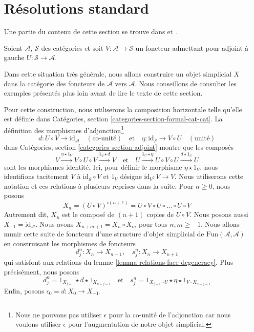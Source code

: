 \section{Résolutions standard}
\label{section-standard}

\noindent
Une partie du contenu de cette section se trouve dans
\cite[Appendice 1]{Godement} et \cite[I 1.5]{cotangent}.

\begin{situation}
\label{situation-adjoint-functors}
Soient $\mathcal{A}$, $\mathcal{S}$ des catégories et soit
$V : \mathcal{A} \to \mathcal{S}$ un foncteur admettant pour adjoint à gauche
$U : \mathcal{S} \to \mathcal{A}$.
\end{situation}

\noindent
Dans cette situation très générale, nous allons construire un objet
simplicial $X$ dans la catégorie des foncteurs de $\mathcal{A}$ vers $\mathcal{A}$.
Nous conseillons de consulter les exemples présentés plus loin avant de lire
le texte de cette section.

\medskip\noindent
Pour cette construction, nous utiliserons la composition horizontale telle
qu'elle est définie dans Catégories, section \ref{categories-section-formal-cat-cat}.
La définition des morphismes d'adjonction\footnote{Nous ne pouvons pas utiliser
$\epsilon$ pour la co-unité de l'adjonction
car nous voulons utiliser $\epsilon$ pour
l'augmentation de notre objet simplicial.}
$$
d : U \circ V \to \text{id}_\mathcal{A} \quad (\text{co-unité})
\quad\text{et}\quad
\eta : \text{id}_\mathcal{S} \to V \circ U \quad (\text{unité})
$$
dans Catégories, section \ref{categories-section-adjoint}
montre que les composés
\begin{equation}
\label{equation-composition}
V \xrightarrow{\eta \star 1_V} V \circ U \circ V \xrightarrow{1_V \star d} V
\quad\text{et}\quad
U \xrightarrow{1_U \star \eta} U \circ V \circ U \xrightarrow{d \star 1_U} U
\end{equation}
sont les morphismes identité. Ici, pour définir le morphisme $\eta \star 1_V$,
nous identifions tacitement $V$ à $\text{id}_\mathcal{S} \circ V$ et
$1_V$ désigne $\text{id}_V : V \to V$. Nous utiliserons cette notation et
ces relations à plusieurs reprises dans la suite.
Pour $n \geq 0$, nous posons
$$
X_n = (U \circ V)^{\circ (n + 1)} =
U \circ V \circ U \circ \ldots \circ U \circ V
$$
Autrement dit, $X_n$ est le composé de $(n + 1)$ copies de $U \circ V$.
Nous posons aussi $X_{-1} = \text{id}_\mathcal{A}$.
Nous avons $X_{n + m + 1} = X_n \circ X_m$ pour tous $n, m \geq -1$.
Nous allons munir cette suite de foncteurs d'une structure d'objet simplicial
de $\text{Fun}(\mathcal{A}, \mathcal{A})$ en construisant les morphismes de
foncteurs
$$
d^n_j : X_n \to X_{n - 1},\quad s^n_j : X_n \to X_{n + 1}
$$
qui satisfont aux relations du
lemme \ref{lemma-relations-face-degeneracy}.
Plus précisément, nous posons
$$
d^n_j = 1_{X_{j - 1}} \star d \star 1_{X_{n - j - 1}}
\quad\text{et}\quad
s^n_j = 1_{X_{j - 1} \circ U} \star \eta \star 1_{V \circ X_{n - j - 1}}
$$
Enfin, posons $\epsilon_0 = d : X_0 \to X_{-1}$.

